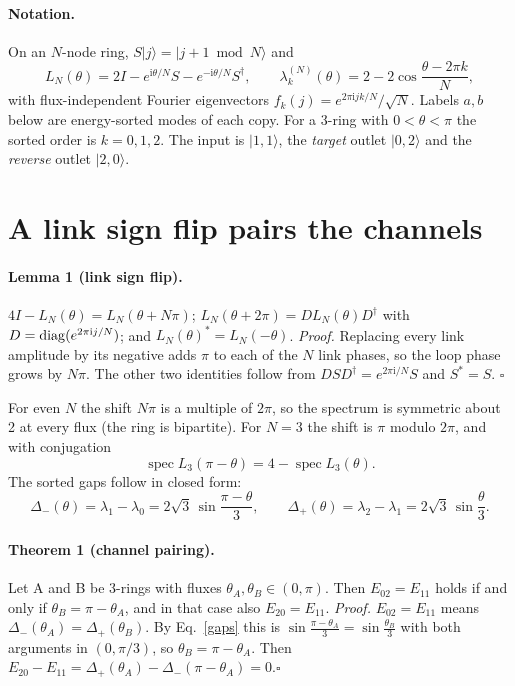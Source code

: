 \documentclass[11pt,a4paper]{article}
\newcommand{\ii}{\mathrm i}
\newcommand{\ket}[1]{|#1\rangle}
\newcommand{\spec}{\operatorname{spec}}
\begin{document}
\paragraph{Notation.} On an $N$-node ring, $S\ket j=\ket{j+1\bmod N}$ and
\begin{equation}
 L_N(\theta)=2I-e^{\ii\theta/N}S-e^{-\ii\theta/N}S^\dagger,\qquad
 \lambda^{(N)}_k(\theta)=2-2\cos\frac{\theta-2\pi k}{N},
\end{equation}
with flux-independent Fourier eigenvectors $f_k(j)=e^{2\pi\ii jk/N}/\sqrt N$.
Labels $a,b$ below are energy-sorted modes of each copy. For a 3-ring with
$0<\theta<\pi$ the sorted order is $k=0,1,2$. The input is $\ket{1,1}$, the
\emph{target} outlet $\ket{0,2}$ and the \emph{reverse} outlet $\ket{2,0}$.

\section{A link sign flip pairs the channels}
\paragraph{Lemma 1 (link sign flip).}
$4I-L_N(\theta)=L_N(\theta+N\pi)$; $L_N(\theta+2\pi)=DL_N(\theta)D^\dagger$
with $D={\rm diag}(e^{2\pi\ii j/N})$; and $L_N(\theta)^*=L_N(-\theta)$.
\emph{Proof.} Replacing every link amplitude by its negative adds $\pi$ to
each of the $N$ link phases, so the loop phase grows by $N\pi$. The other
two identities follow from $DSD^\dagger=e^{2\pi\ii/N}S$ and $S^*=S$.
\hfill$\square$

For even $N$ the shift $N\pi$ is a multiple of $2\pi$, so the spectrum is
symmetric about 2 at every flux (the ring is bipartite). For $N=3$ the
shift is $\pi$ modulo $2\pi$, and with conjugation
\begin{equation}
 \spec L_3(\pi-\theta)=4-\spec L_3(\theta).\label{mirror}
\end{equation}
The sorted gaps follow in closed form:
\begin{equation}
 \Delta_-(\theta)=\lambda_1-\lambda_0=2\sqrt3\,\sin\frac{\pi-\theta}{3},\qquad
 \Delta_+(\theta)=\lambda_2-\lambda_1=2\sqrt3\,\sin\frac{\theta}{3}.\label{gaps}
\end{equation}

\paragraph{Theorem 1 (channel pairing).}
Let A and B be 3-rings with fluxes $\theta_A,\theta_B\in(0,\pi)$. Then
$E_{02}=E_{11}$ holds if and only if $\theta_B=\pi-\theta_A$, and in that
case also $E_{20}=E_{11}$.
\emph{Proof.} $E_{02}=E_{11}$ means $\Delta_-(\theta_A)=\Delta_+(\theta_B)$.
By Eq.~\eqref{gaps} this is $\sin\frac{\pi-\theta_A}{3}=\sin\frac{\theta_B}{3}$
with both arguments in $(0,\pi/3)$, so $\theta_B=\pi-\theta_A$. Then
$E_{20}-E_{11}=\Delta_+(\theta_A)-\Delta_-(\pi-\theta_A)=0$.\hfill$\square$
\end{document}
